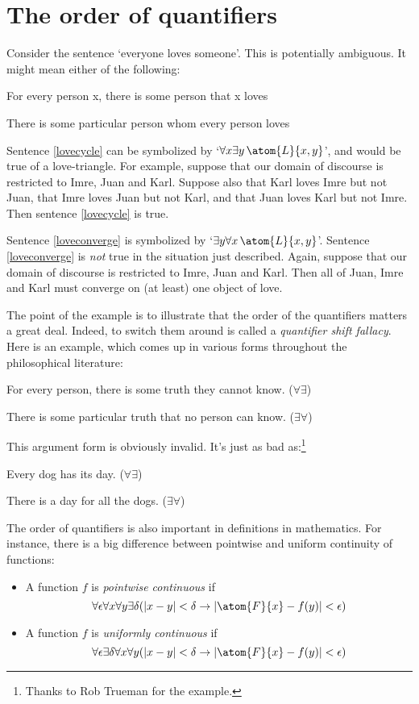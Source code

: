 \section{The order of quantifiers}\label{ss:OrderQuant}
Consider the sentence `everyone loves someone'. This is potentially ambiguous. It might mean either of the following:
	\begin{earg}
		\item[\ex{lovecycle}] For every person x, there is some person that x loves
		\item[\ex{loveconverge}] There is some particular person whom every person loves
	\end{earg}
Sentence \ref{lovecycle} can be symbolized by `$\forall x \exists y\, \atom{L}{x,y}$', and would be true of a love-triangle. For example, suppose that our domain of discourse is restricted to Imre, Juan and Karl. Suppose also that Karl loves Imre but not Juan, that Imre loves Juan but not Karl, and that Juan loves Karl but not Imre. Then sentence \ref{lovecycle} is true.

Sentence \ref{loveconverge} is symbolized by `$\exists y \forall x\, \atom{L}{x,y}$'. Sentence \ref{loveconverge} is \emph{not} true in the situation just described. Again, suppose that our domain of discourse is restricted to Imre, Juan and Karl. Then all of Juan, Imre and Karl must converge on (at least) one object of love.

The point of the example is to illustrate that the order of the quantifiers matters a great deal. Indeed, to switch them around is called a \emph{quantifier shift fallacy}. Here is an example, which comes up in various forms throughout the philosophical literature:
	\begin{earg}
		\item[] For every person, there is some truth they cannot know. \hfill ($\forall \exists$)
		\item[\therefore] There is some particular truth that no person can know. \hfill ($\exists \forall$)
	\end{earg}
This argument form is obviously invalid. It's just as bad as:\footnote{Thanks to Rob Trueman for the example.}
	\begin{earg}
		\item[] Every dog has its day. \hfill ($\forall \exists$)
		\item[\therefore] There is a day for all the dogs. \hfill ($\exists \forall$)
	\end{earg}

   
The order of quantifiers is also important in definitions in mathematics.  For instance, there is a big difference between pointwise and uniform continuity of functions:
\begin{itemize}
\item A function $f$ is \emph{pointwise continuous} if
\[
\forall \epsilon\forall x\forall y\exists \delta(\left|x - y\right| < \delta \to \left|\atom{F}{x} - f(y)\right| < \epsilon)
\]
\item A function $f$ is \emph{uniformly continuous} if
\[
\forall \epsilon\exists \delta\forall x\forall y(\left|x - y\right| < \delta \to \left|\atom{F}{x} - f(y)\right| < \epsilon)
\]
\end{itemize}

